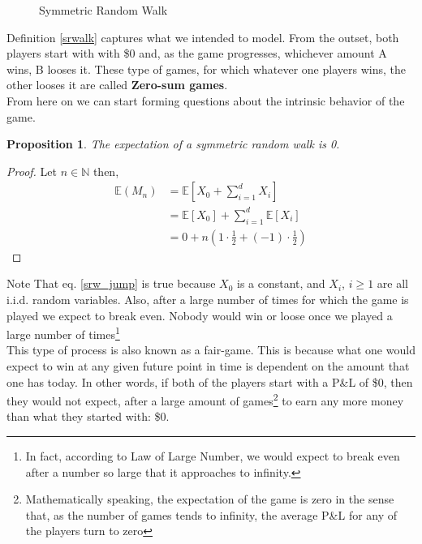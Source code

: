 \documentclass[11pt]{report}
\newtheorem{proposition}{Proposition}[chapter]
\begin{document}
\begin{figure}[h]
	\centering
	
	\caption{Symmetric Random Walk}
\end{figure}

Definition \ref{srwalk} captures what we intended to model. From the outset, both players start with with \$0 and, as the game progresses, whichever amount A wins, B looses it. These type of games, for which whatever one players wins, the other looses it are called \textbf{Zero-sum games}.\\

From here on we can start forming questions about the intrinsic behavior of the game. 

\begin{proposition}\label{expectation_srw}
	The expectation of a symmetric random walk is 0.
\end{proposition}

\begin{proof}
	Let $n \in \mathbb{N}$ then,
	\begin{align}
	\mathbb{E}(M_n) &= \mathbb{E}\left[X_0 + \sum_{i=1}^d X_i\right] \nonumber \\
				    &= \mathbb{E}[X_0] + \sum_{i=1}^d \mathbb{E}\left[X_i\right] \label{srw_jump}\\
				    &= 0 + n  \left( 1 \cdot \frac{1}{2} + (-1) \cdot \frac{1}{2}\right) \nonumber
	\end{align}
\end{proof}

Note That eq. \ref{srw_jump} is true because $X_0$ is a constant, and $X_i$, $i \geq 1$ are all i.i.d. random variables. Also, after a large number of times for which the game is played we expect to break even. Nobody would win or loose once we played a large number of times\footnote{In fact, according to Law of Large Number, we would expect to break even after a number so large that it approaches to infinity.}\\

This type of process is also known as a fair-game. This is because what one would expect to win at any given future point in time is dependent on the amount that one has today. In other words, if both of the players start with a P\&L of \$0, then they would not expect, after a large amount of games\footnote{Mathematically speaking, the expectation of the game is zero in the sense that, as the number of games tends to infinity, the average P\&L for any of the players turn to zero} to earn any more money than what they started with: \$0.\\
\end{document}
